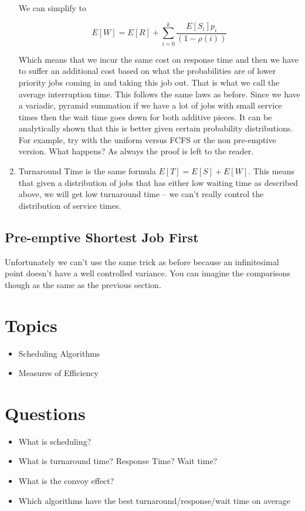 \begin{enumerate}
  We can simplify to

  \[
  E[W] = E[R] + \sum\limits_{i=0}^k \frac{E[S_i]p_i}{(1 - \rho(i))}
  \]

  Which means that we incur the same cost on response time and then we have to suffer an additional cost based on what the probabilities are of lower priority jobs coming in and taking this job out.
  That is what we call the average interruption time.
  This follows the same laws as before.
  Since we have a variadic, pyramid summation if we have a lot of jobs with small service times then the wait time goes down for both additive pieces.
  It can be analytically shown that this is better given certain probability distributions.
  For example, try with the uniform versus FCFS or the non pre-emptive version.
  What happens?
  As always the proof is left to the reader.

\item Turnaround Time is the same formula $E[T] = E[S] + E[W]$. This means that given a distribution of jobs that has either low waiting time as described above, we will get low turnaround time -- we can't really control the distribution of service times.
\end{enumerate}

\subsection{Pre-emptive Shortest Job First}

Unfortunately we can't use the same trick as before because an infinitesimal point doesn't have a well controlled variance.
You can imagine the comparisons though as the same as the previous section.

\section{Topics}

\begin{itemize}
\tightlist
\item
  Scheduling Algorithms
\item
  Measures of Efficiency
\end{itemize}

\section{Questions}

\begin{itemize}
\tightlist
\item
  What is scheduling?
\item
  What is turnaround time? Response Time? Wait time?
\item
  What is the convoy effect?
\item
  Which algorithms have the best turnaround/response/wait time on average
\end{itemize}



